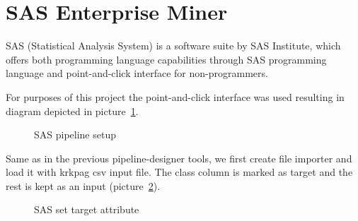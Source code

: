 \documentclass[11pt]{article}
\begin{document}
\section{SAS Enterprise Miner}
SAS (Statistical Analysis System) is a software suite by SAS Institute, which
offers both programming language capabilities through SAS programming language
and point-and-click interface for non-programmers.

For purposes of this project the point-and-click interface was used resulting
in diagram depicted in picture~\ref{pic:sas_diagram}.

\begin{figure}[!ht]
	\centering
    \caption{SAS pipeline setup}
    \label{pic:sas_diagram}
\end{figure}

Same as in the previous pipeline-designer tools, we first create file importer
and load it with krkpag csv input file. The class column is marked as target
and the rest is kept as an input (picture~\ref{pic:sas_settarget}).

\begin{figure}[!ht]
	\centering
    \caption{SAS set target attribute}
    \label{pic:sas_settarget}
\end{figure}
\end{document}
